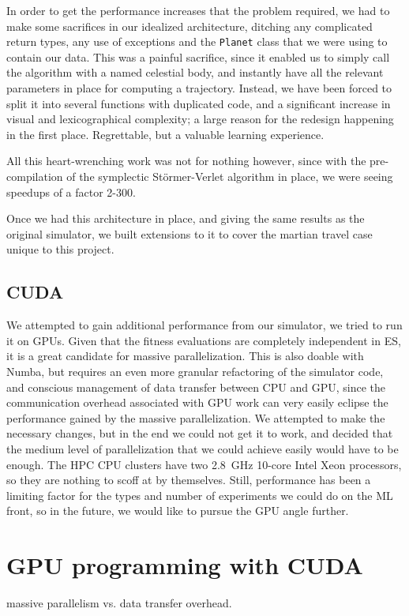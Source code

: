 In order to get the performance increases that the problem required, we had to make some sacrifices in our idealized architecture, ditching any complicated return types, any use of exceptions and the \texttt{Planet} class that we were using to contain our data. This was a painful sacrifice, since it enabled us to simply call the algorithm with a named celestial body, and instantly have all the relevant parameters in place for computing a trajectory. Instead, we have been forced to split it into several functions with duplicated code, and a significant increase in visual and lexicographical complexity; a large reason for the redesign happening in the first place. Regrettable, but a valuable learning experience.

All this heart-wrenching work was not for nothing however, since with the pre-compilation of the symplectic Störmer-Verlet algorithm in place, we were seeing speedups of a factor 2-300. 

Once we had this architecture in place, and giving the same results as the original simulator, we built extensions to it to cover the martian travel case unique to this project.

\subsection{CUDA}

We attempted to gain additional performance from our simulator, we tried to run it on GPUs. Given that the fitness evaluations are completely independent in ES, it is a great candidate for massive parallelization. This is also doable with Numba, but requires an even more granular refactoring of the simulator code, and conscious management of data transfer between CPU and GPU, since the communication overhead associated with GPU work can very easily eclipse the performance gained by the massive parallelization. We attempted to make the necessary changes, but in the end we could not get it to work, and decided that the medium level of parallelization that we could achieve easily would have to be enough. The HPC CPU clusters have two \SI{2.8}{\GHz} 10-core Intel Xeon processors, so they are nothing to scoff at by themselves. Still, performance has been a limiting factor for the types and number of experiments we could do on the ML front, so in the future, we would like to pursue the GPU angle further.



\section{GPU programming with CUDA}
massive parallelism vs. data transfer overhead.

